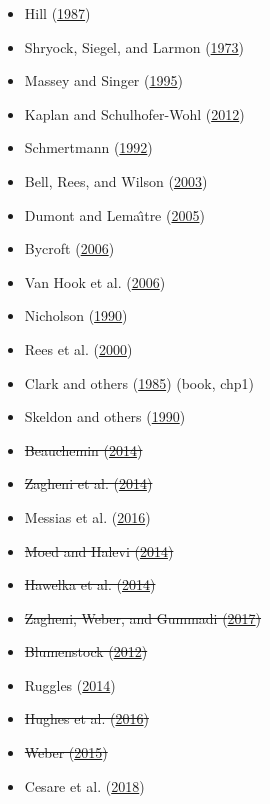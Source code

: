 \documentclass[
]{article}
\providecommand{\tightlist}{%
  \setlength{\itemsep}{0pt}\setlength{\parskip}{0pt}}
\begin{document}
\begin{itemize}
\tightlist
\item
  Hill (\protect\hyperlink{ref-hill1987new}{1987})
\item
  Shryock, Siegel, and Larmon
  (\protect\hyperlink{ref-shryock1973methods}{1973})
\item
  Massey and Singer (\protect\hyperlink{ref-massey1995new}{1995})
\item
  Kaplan and Schulhofer-Wohl
  (\protect\hyperlink{ref-kaplan2012interstate}{2012})
\item
  Schmertmann (\protect\hyperlink{ref-schmertmann1992estimation}{1992})
\item
  Bell, Rees, and Wilson
  (\protect\hyperlink{ref-bell2003comparing}{2003})
\item
  Dumont and Lemaı̂tre (\protect\hyperlink{ref-dumont2005counting}{2005})
\item
  Bycroft (\protect\hyperlink{ref-bycroft2006challenges}{2006})
\item
  Van Hook et al. (\protect\hyperlink{ref-van2006foreign}{2006})
\item
  Nicholson (\protect\hyperlink{ref-nicholson1990hidden}{1990})
\item
  Rees et al. (\protect\hyperlink{ref-rees2000problems}{2000})
\item
  Clark and others (\protect\hyperlink{ref-clark1985human}{1985}) (book,
  chp1)
\item
  Skeldon and others
  (\protect\hyperlink{ref-skeldon1990population}{1990})
\item
  \sout{Beauchemin
  (\protect\hyperlink{ref-beauchemin2014manifesto}{2014})}
\item
  \sout{Zagheni et al.
  (\protect\hyperlink{ref-zagheni2014inferring}{2014})}
\item
  Messias et al. (\protect\hyperlink{ref-messias2016migration}{2016})
\item
  \sout{Moed and Halevi
  (\protect\hyperlink{ref-moed2014bibliometric}{2014})}
\item
  \sout{Hawelka et al. (\protect\hyperlink{ref-hawelka2014geo}{2014})}
\item
  \sout{Zagheni, Weber, and Gummadi
  (\protect\hyperlink{ref-zagheni2017leveraging}{2017})}
\item
  \sout{Blumenstock
  (\protect\hyperlink{ref-blumenstock2012inferring}{2012})}
\item
  Ruggles (\protect\hyperlink{ref-ruggles2014big}{2014})
\item
  \sout{Hughes et al.
  (\protect\hyperlink{ref-hughes2016inferring}{2016})}
\item
  \sout{Weber (\protect\hyperlink{ref-weber2015demographic}{2015})}
\item
  Cesare et al. (\protect\hyperlink{ref-cesare2018promises}{2018})
\end{itemize}
\end{document}

